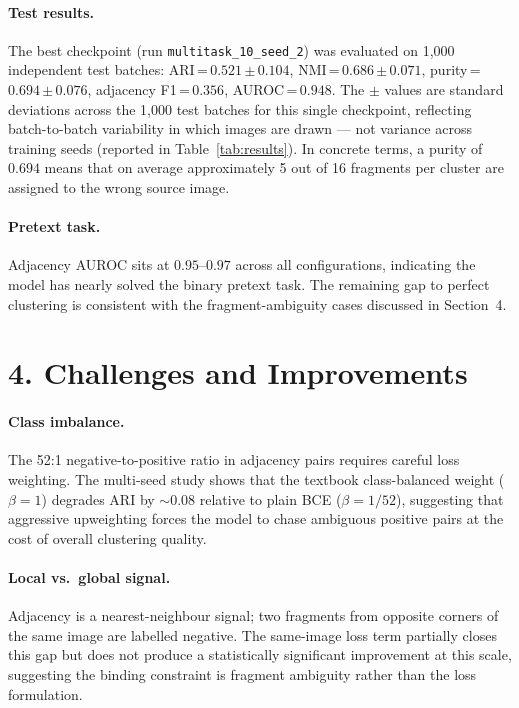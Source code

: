 \documentclass[10pt, a4paper, twocolumn]{article}
\begin{document}
\paragraph{Test results.}
The best checkpoint (run \texttt{multitask\_10\_seed\_2}) was evaluated on
1{,}000 independent test batches:
ARI\,=\,$0.521$\,$\pm$\,$0.104$,
NMI\,=\,$0.686$\,$\pm$\,$0.071$,
purity\,=\,$0.694$\,$\pm$\,$0.076$,
adjacency F1\,=\,$0.356$, AUROC\,=\,$0.948$.
The $\pm$ values are standard deviations across the 1{,}000 test batches
for this single checkpoint, reflecting batch-to-batch variability in which
images are drawn --- not variance across training seeds (reported in
Table~\ref{tab:results}).
In concrete terms, a purity of $0.694$ means that on average approximately
5 out of 16 fragments per cluster are assigned to the wrong source image.

\paragraph{Pretext task.}
Adjacency AUROC sits at $0.95$--$0.97$ across all configurations, indicating
the model has nearly solved the binary pretext task. The remaining gap to perfect clustering is consistent with the
fragment-ambiguity cases discussed in Section~4.

\section*{4. Challenges and Improvements}

\paragraph{Class imbalance.}
The 52:1 negative-to-positive ratio in adjacency pairs requires careful loss
weighting. The multi-seed study shows that the textbook class-balanced
weight ($\beta=1$) degrades ARI by $\sim\!0.08$ relative to plain BCE
($\beta=1/52$), suggesting that aggressive upweighting forces the model
to chase ambiguous positive pairs at the cost of overall clustering quality.

\paragraph{Local vs.\ global signal.}
Adjacency is a nearest-neighbour signal; two fragments from opposite corners
of the same image are labelled negative. The same-image loss term partially
closes this gap but does not produce a statistically significant improvement
at this scale, suggesting the binding constraint is fragment ambiguity rather
than the loss formulation.
\end{document}
